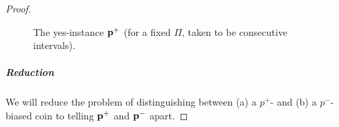 \begin{proof}
\begin{figure}[!ht]
\caption{\label{fig:construction:lb:tolerant:uniformity:D:pm}The \textsf{yes}-instance $\mathbf{p}^+$ (for a fixed $\Pi$, taken to be consecutive intervals).}
\end{figure}
  
  \subparagraph{Reduction} We will reduce the problem of distinguishing between \textsf{(a)} a $p^+$- and \textsf{(b)} a $p^-$-biased coin to telling $\mathbf{p}^+$ and $\mathbf{p}^-$ apart.
  

\end{proof}
